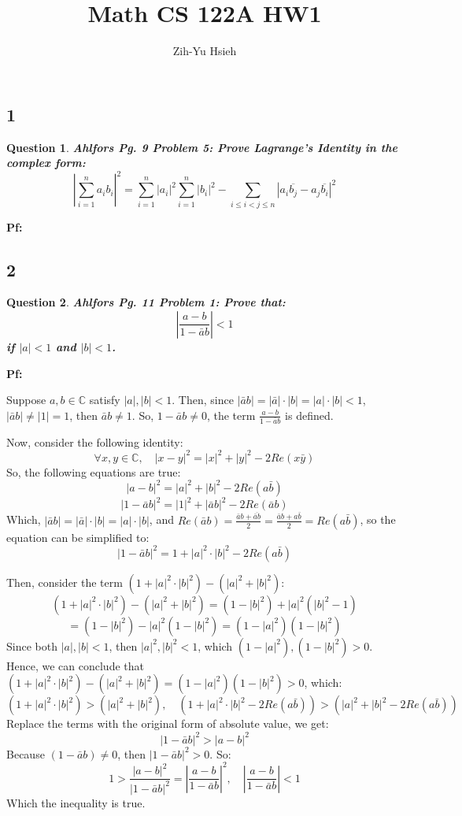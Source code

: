 \documentclass{article}
\title{Math CS 122A HW1}
\author{Zih-Yu Hsieh}
\newtheorem{question}{Question}
\begin{document}
\maketitle

\subsection*{1}
\begin{question}
    \textbf{Ahlfors Pg. 9 Problem 5:
    Prove Lagrange's Identity in the complex form:
    $$\left|\sum_{i=1}^{n}a_ib_i\right|^2 = \sum_{i=1}^{n}|a_i|^2\sum_{i=1}^{n}|b_i|^2-\sum_{i\leq i<j\leq n}|a_i\overline{b_j}-a_j\overline{b_i}|^2$$}
\end{question}

\hfill

\textbf{Pf:}

\break

\subsection*{2}
\begin{question}
    \textbf{Ahlfors Pg. 11 Problem 1:
    Prove that:
    $$\left|\frac{a-b}{1-\bar{a}b}\right| < 1$$
    if $|a|<1$ and $|b|<1$.
    }
\end{question}

\hfill

\textbf{Pf:}

Suppose $a,b\in\mathbb{C}$ satisfy $|a|,|b| <1$. Then, since $|\bar{a}b| = |\bar{a}|\cdot |b| = |a|\cdot |b| <1$,
$|\bar{a}b| \neq |1| = 1$, then $\bar{a}b \neq 1$.
So, $1-\bar{a}b \neq 0$, the term $\frac{a-b}{1-\bar{a}b}$ is defined.

Now, consider the following identity:
$$\forall x,y\in \mathbb{C},\quad |x-y|^2 = |x|^2+|y|^2 - 2 Re(x\bar{y})$$
So, the following equations are true:
$$|a-b|^2 = |a|^2+|b|^2-2Re(a\bar{b})$$
$$|1-\bar{a}b|^2 = |1|^2+|\bar{a}b|^2-2Re(\bar{a}b)$$
Which, $|\bar{a}b| = |\bar{a}|\cdot|b| = |a|\cdot|b|$, and $Re(\bar{a}b) = \frac{\bar{a}b + \overline{\bar{a}b}}{2} = \frac{\bar{a}b + a\bar{b}}{2} = Re(a\bar{b})$,
so the equation can be simplified to:
$$|1-\bar{a}b|^2 = 1+|a|^2\cdot|b|^2-2Re(a\bar{b})$$

Then, consider the term $(1+|a|^2\cdot|b|^2)-(|a|^2+|b|^2)$:
$$(1+|a|^2\cdot|b|^2)-(|a|^2+|b|^2) = (1-|b|^2)+|a|^2(|b|^2-1)$$
$$ = (1-|b|^2)-|a|^2(1-|b|^2)=(1-|a|^2)(1-|b|^2)$$
Since both $|a|,|b|<1$, then $|a|^2,|b|^2 <1$, which $(1-|a|^2),(1-|b|^2)>0$. 
Hence, we can conclude that $(1+|a|^2\cdot|b|^2)-(|a|^2+|b|^2) = (1-|a|^2)(1-|b|^2) >0$, which: 
$$(1+|a|^2\cdot|b|^2) > (|a|^2+|b|^2),\quad (1+|a|^2\cdot|b|^2-2Re(a\bar{b})) > (|a|^2+|b|^2-2Re(a\bar{b}))$$
Replace the terms with the original form of absolute value, we get:
$$|1-\bar{a}b|^2 > |a-b|^2$$
Because $(1-\bar{a}b)\neq 0$, then $|1-\bar{a}b|^2 >0$. So:
$$1 > \frac{|a-b|^2}{|1-\bar{a}b|^2} = \left|\frac{a-b}{1-\bar{a}b}\right|^2,\quad \left|\frac{a-b}{1-\bar{a}b}\right| <1$$
Which the inequality is true.
\end{document}
